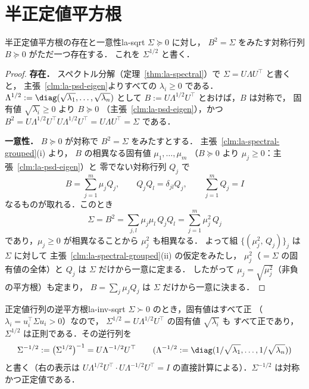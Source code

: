 \section{半正定値平方根}

\begin{theorem}{半正定値平方根の存在と一意性}{la-sqrt}
  $\Sigma\succeq0$ に対し，
  $B^2=\Sigma$ をみたす対称行列 $B\succeq0$ がただ一つ存在する．
  これを $\Sigma^{1/2}$ と書く．
\end{theorem}

\begin{proof}
  \textbf{存在．}
  スペクトル分解（定理~\ref{thm:la-spectral}）で
  $\Sigma=U\Lambda U^\top$ と書くと，
  主張~\ref{clm:la-psd-eigen}よりすべての $\lambda_i\geq0$ である．
  $\Lambda^{1/2}:=\diag(\sqrt{\lambda_1},\dots,\sqrt{\lambda_n})$ として
  $B:=U\Lambda^{1/2}U^\top$ とおけば，$B$ は対称で，
  固有値 $\sqrt{\lambda_i}\geq0$ より $B\succeq0$
  （主張~\ref{clm:la-psd-eigen}），かつ
  $B^2=U\Lambda^{1/2}U^\top U\Lambda^{1/2}U^\top=U\Lambda U^\top=\Sigma$ である．

  \textbf{一意性．}
  $B\succeq0$ が対称で $B^2=\Sigma$ をみたすとする．
  主張~\ref{clm:la-spectral-grouped}(i) より，
  $B$ の相異なる固有値 $\mu_1,\dots,\mu_m$
  （$B\succeq0$ より $\mu_j\geq0$：主張~\ref{clm:la-psd-eigen}）と
  零でない対称行列 $Q_j$ で
  \[
    B=\sum_{j=1}^m\mu_jQ_j,
    \qquad
    Q_jQ_l=\delta_{jl}Q_j,
    \qquad
    \sum_{j=1}^mQ_j=I
  \]
  なるものが取れる．このとき
  \[
    \Sigma=B^2
    =\sum_{j,l}\mu_j\mu_l\,Q_jQ_l
    =\sum_{j=1}^m\mu_j^2\,Q_j
  \]
  であり，$\mu_j\geq0$ が相異なることから $\mu_j^2$ も相異なる．
  よって組 $\{(\mu_j^2,\,Q_j)\}_j$ は $\Sigma$ に対して
  主張~\ref{clm:la-spectral-grouped}(ii) の仮定をみたし，
  $\mu_j^2$（$=\Sigma$ の固有値の全体）と $Q_j$ は
  $\Sigma$ だけから一意に定まる．
  したがって $\mu_j=\sqrt{\mu_j^2}$（非負の平方根）も定まり，
  $B=\sum_j\mu_jQ_j$ は $\Sigma$ だけから一意に決まる．
\end{proof}

\begin{remark}{正定値行列の逆平方根}{la-inv-sqrt}
  $\Sigma\succ0$ のとき，固有値はすべて正
  （$\lambda_i=u_i^\top\Sigma u_i>0$）なので，
  $\Sigma^{1/2}=U\Lambda^{1/2}U^\top$ の固有値 $\sqrt{\lambda_i}$ も
  すべて正であり，$\Sigma^{1/2}$ は正則である．その逆行列を
  \[
    \Sigma^{-1/2}
    :=\bigl(\Sigma^{1/2}\bigr)^{-1}
    =U\Lambda^{-1/2}U^\top
    \qquad(\Lambda^{-1/2}:=\diag(1/\sqrt{\lambda_1},\dots,1/\sqrt{\lambda_n}))
  \]
  と書く（右の表示は $U\Lambda^{1/2}U^\top\cdot U\Lambda^{-1/2}U^\top=I$
  の直接計算による）．$\Sigma^{-1/2}$ は対称かつ正定値である．
\end{remark}

